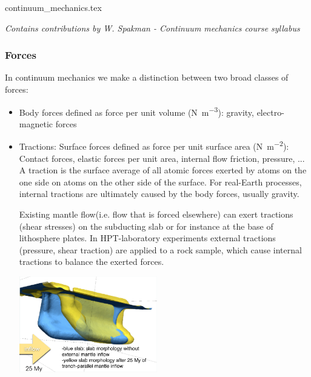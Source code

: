 \begin{flushright} {\tiny {\color{gray} continuum\_mechanics.tex}} \end{flushright}

{\sl Contains contributions by W. Spakman - Continuum mechanics course syllabus} 

\subsubsection{Forces}

In continuum mechanics we make a distinction between two broad classes of forces:
\begin{itemize}
\item Body forces defined as force per unit volume (\si{\newton\per\cubic\metre}): 
gravity, electro-magnetic forces
\item Tractions: Surface forces defined as force per unit surface area (\si{\newton\per\square\metre}):
Contact forces, elastic forces per unit area, internal flow friction, pressure, ...\\
A traction is the surface average of all atomic forces exerted by
atoms on the one side on atoms on the other side of the surface.
For real-Earth processes, internal tractions are ultimately caused by
the body forces, usually gravity.


Existing mantle flow(i.e. flow that is forced elsewhere) can exert
tractions (shear stresses) on the subducting slab or for instance at
the base of lithosphere plates.
In HPT-laboratory experiments external tractions (pressure, shear
traction) are applied to a rock sample, which cause internal
tractions to balance the exerted forces.

\begin{center}
\includegraphics[width=6cm]{images/contmech/spak1}
\end{center}
\end{itemize}

